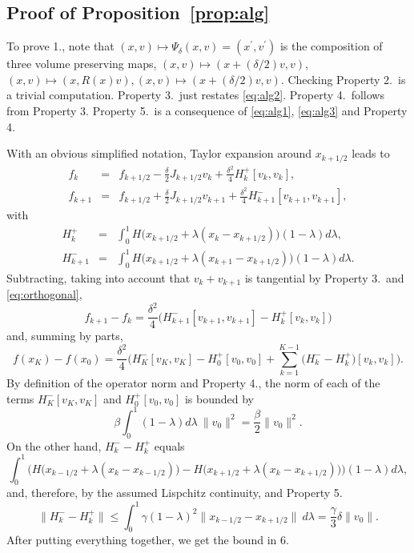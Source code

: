 \documentclass[10pt]{article}
\begin{document}
\subsection{Proof of Proposition~\ref{prop:alg}}

To prove 1., note that \((x,v)\mapsto \Psi_\delta(x,v) = (x^\prime,v^\prime)\) is the composition of three volume preserving maps,
\(
(x,v)\mapsto (x+(\delta/2)v,v)
\), \((x,v)\mapsto (x,R(x)v), (x,v) \mapsto (x+(\delta/2)v,v)\). Checking Property 2.\ is a trivial computation. Property 3.\ just restates \eqref{eq:alg2}.
 Property 4.\ follows from Property 3. Property 5.\ is a consequence of \eqref{eq:alg1}, \eqref{eq:alg3} and Property
 4.

With an obvious simplified notation, Taylor expansion around \(x_{k+1/2}\) leads to
\begin{eqnarray*}
f_k & =& f_{k+1/2}-\frac{\delta}{2}J_{k+1/2}v_k +\frac{\delta^2}{4} H_k^+[v_k,v_k],\\
f_{k+1} & =& f_{k+1/2}+\frac{\delta}{2}J_{k+1/2}v_{k+1} +\frac{\delta^2}{4} H_{k+1}^-[v_{k+1},v_{k+1}],
\end{eqnarray*}
with
\begin{eqnarray*}
H_k^+ &= & \int_0^1 H\big(x_{k+1/2}+\lambda (x_k-x_{k+1/2})\big)(1-\lambda)d\lambda,\\
 H_{k+1}^-&=& \int_0^1 H\big(x_{k+1/2}+\lambda (x_{k+1}-x_{k+1/2})\big)(1-\lambda)d\lambda.
\end{eqnarray*}
Subtracting, taking into account that \(v_k+v_{k+1}\) is tangential by Property 3.\ and \eqref{eq:orthogonal},
\begin{equation}
\label{eq:fincrement}f_{k+1}-f_k = \frac{\delta^2}{4}  \Big( H_{k+1}^-[v_{k+1},v_{k+1}]-H_k^+[v_k,v_k]\Big)
\end{equation}
and, summing by parts,
\[
f(x_K)-f(x_0) =  \frac{\delta^2}{4}  \Big(  H_K^-[v_K,v_K]- H_0^+[v_0,v_0]+\sum_{k=1}^{K-1} \big(H_k^- -H_k^+\big)[v_k,v_k]\Big).
\]
By definition of the operator norm and Property 4., the norm of each of the terms \( H_K^-[v_K,v_K]\) and \(H_0^+[v_0,v_0]\) is bounded by
%
 \[ \beta \int_0^1 (1-\lambda) d\lambda\: \|v_0\|^2 = \frac{\beta}{2}\|v_0\|^2.
\]
%
On the other hand, \(H_k^- -H_k^+\) equals
\[
 \int_0^1 \Big(H\big(x_{k-1/2}+\lambda (x_{k}-x_{k-1/2})\big)-H\big(x_{k+1/2}+\lambda (x_k-x_{k+1/2})\big)\Big)(1-\lambda)d\lambda,
\]
and, therefore, by the assumed Lispchitz continuity, and Property 5.
\[
\|H_k^- -H_k^+\| \leq \int_0^1 \gamma (1-\lambda)^2 \|x_{k-1/2}-x_{k+1/2}\|\:d\lambda = \frac{\gamma}{3} \delta \|v_0\|.
\]
After putting everything together, we get the bound in 6.
\end{document}
